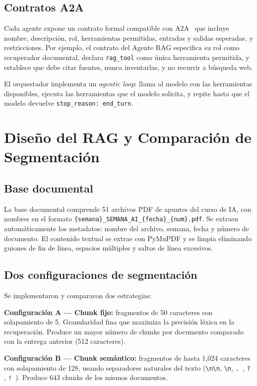 \documentclass[conference]{IEEEtran}
\begin{document}
\subsection{Contratos A2A}

Cada agente expone un contrato formal compatible con A2A~\cite{a2a2024} que incluye nombre, descripción, rol, herramientas permitidas, entradas y salidas esperadas, y restricciones. Por ejemplo, el contrato del Agente RAG especifica su rol como recuperador documental, declara \texttt{rag\_tool} como única herramienta permitida, y establece que debe citar fuentes, nunca inventarlas, y no recurrir a búsqueda web.

El orquestador implementa un \textit{agentic loop}: llama al modelo con las herramientas disponibles, ejecuta las herramientas que el modelo solicita, y repite hasta que el modelo devuelve \texttt{stop\_reason: end\_turn}.

\section{Diseño del RAG y Comparación de Segmentación}

\subsection{Base documental}

La base documental comprende 51 archivos PDF de apuntes del curso de IA, con nombres en el formato \texttt{\{semana\}\_SEMANA\_AI\_\{fecha\}\_\{num\}.pdf}. Se extraen automáticamente los metadatos: nombre del archivo, semana, fecha y número de documento. El contenido textual se extrae con PyMuPDF y se limpia eliminando guiones de fin de línea, espacios múltiples y saltos de línea excesivos.

\subsection{Dos configuraciones de segmentación}

Se implementaron y compararon dos estrategias:

\textbf{Configuración A — Chunk fijo:} fragmentos de 50 caracteres con solapamiento de 5. Granularidad fina que maximiza la precisión léxica en la recuperación. Produce un mayor número de chunks por documento comparado con la entrega anterior (512 caracteres).

\textbf{Configuración B — Chunk semántico:} fragmentos de hasta 1{,}024 caracteres con solapamiento de 128, usando separadores naturales del texto (\texttt{\textbackslash n\textbackslash n}, \texttt{\textbackslash n}, \texttt{. }, \texttt{? }, \texttt{! }). Produce 643 chunks de los mismos documentos.
\end{document}
